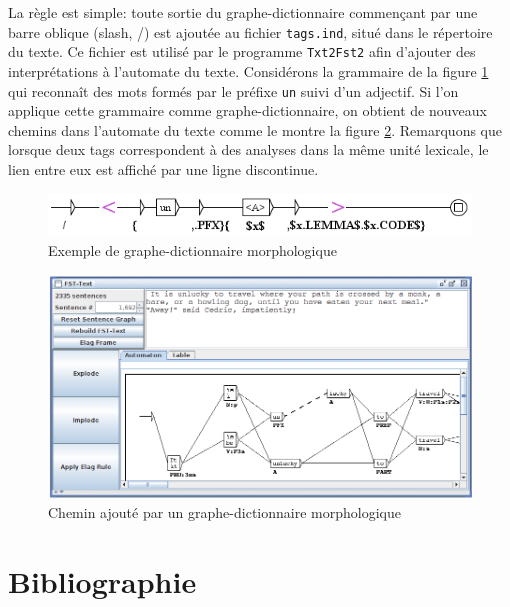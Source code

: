 \bigskip
\noindent La règle est simple: toute sortie du graphe-dictionnaire commençant par une barre oblique (slash, /) 
est ajoutée au fichier \verb+tags.ind+,  situé dans le répertoire du texte.
Ce fichier est utilisé par le programme \verb+Txt2Fst2+ afin d'ajouter des interprétations à
l'automate du texte. Considérons la grammaire de la figure \ref{morphoA} qui reconnaît des mots
formés par le préfixe \verb+un+ suivi d'un adjectif. Si l'on applique cette grammaire comme graphe-dictionnaire,
on obtient de nouveaux chemins dans l'automate du texte comme le montre la figure
\ref{morphoB}. Remarquons que lorsque deux tags correspondent à des analyses dans la même unité lexicale, le lien entre eux est affiché par une ligne discontinue.

\begin{figure}[!ht]
\begin{center}
\includegraphics[width=14cm]{resources/img/fig3-14a.png}
\caption{Exemple de graphe-dictionnaire morphologique\label{morphoA}}
\end{center}
\end{figure}

\begin{figure}[!ht]
\begin{center}
\includegraphics[width=15cm]{resources/img/fig3-14b.png}
\caption{Chemin ajouté par un graphe-dictionnaire morphologique\label{morphoB}}
\end{center}
\end{figure}

\section{Bibliographie}

